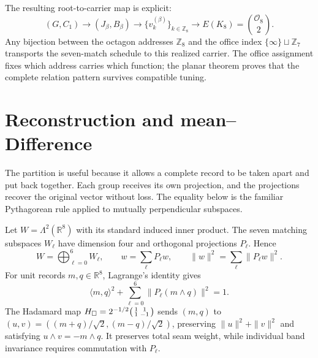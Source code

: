 \documentclass[10pt]{article}
\newcommand{\R}{\mathbb R}
\newcommand{\Z}{\mathbb Z}
\begin{document}
The resulting root-to-carrier map is explicit:
\begin{equation}
\boxed{(G,C_1)\longrightarrow(J_\beta,B_\beta)
\longrightarrow\{v_k^{(\beta)}\}_{k\in\Z_8}
\longrightarrow E(K_8)=\binom{\mathcal O_8}{2}.}
\end{equation}
Any bijection between the octagon addresses $\Z_8$ and the office index
$\{\infty\}\sqcup\Z_7$ transports the seven-match schedule to this realized carrier. The office assignment fixes which address carries which function; the planar theorem proves that the complete relation pattern survives compatible tuning.

\section{Reconstruction and mean--Difference}\label{sec:recon}
The partition is useful because it allows a complete record to be taken apart and put back together. Each group receives its own projection, and the projections recover the original vector without loss. The equality below is the familiar Pythagorean rule applied to mutually perpendicular subspaces.


Let $W=\Lambda^2(\R^8)$ with its standard induced inner product. The seven matching subspaces $W_\ell$ have dimension four and orthogonal projections $P_\ell$. Hence
\begin{equation}W=\bigoplus_{\ell=0}^{6}W_\ell,\qquad w=\sum_\ell P_\ell w,\qquad\|w\|^2=\sum_\ell\|P_\ell w\|^2.\end{equation}
For unit records $m,q\in\R^8$, Lagrange's identity gives
\begin{equation}\boxed{\langle m,q\rangle^2+\sum_{\ell=0}^{6}\|P_\ell(m\wedge q)\|^2=1.}\end{equation}
The Hadamard map $H_\Box=2^{-1/2}\begin{psmallmatrix}1&1\\1&-1\end{psmallmatrix}$ sends $(m,q)$ to $(u,v)=((m+q)/\sqrt2,(m-q)/\sqrt2)$, preserving $\|u\|^2+\|v\|^2$ and satisfying $u\wedge v=-m\wedge q$. It preserves total seam weight, while individual band invariance requires commutation with $P_\ell$.
\end{document}
